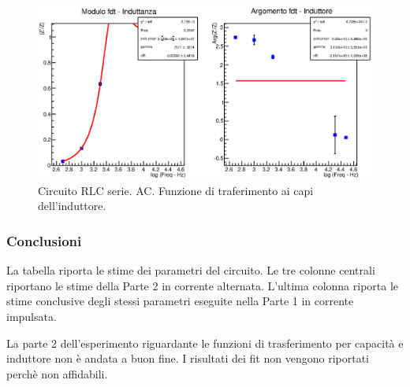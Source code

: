 \begin{figure}[H]
\centering
\includegraphics[scale=0.75]{Grafici/C4_P2_Ind.eps}
\caption{
Circuito RLC serie.
AC.
Funzione di traferimento ai capi dell'induttore.
}
\label{fig:C4_P2_Ind}
\end{figure}



\subsubsection{Conclusioni}

La tabella riporta le stime dei parametri del circuito.
Le tre colonne centrali riportano le stime della Parte 2 in corrente alternata. L'ultima colonna riporta le stime conclusive degli stessi parametri eseguite nella Parte 1 in corrente impulsata.

La parte 2 dell'esperimento riguardante le funzioni di trasferimento per capacità e induttore non è andata a buon fine. I risultati dei fit non vengono riportati perchè non affidabili.




\break
